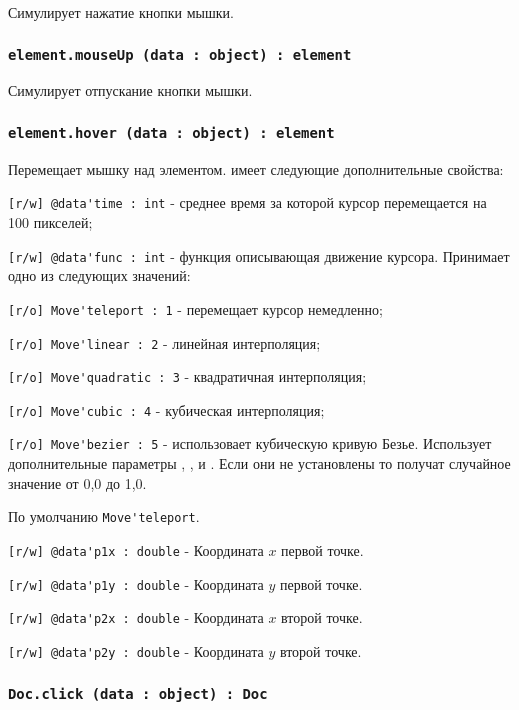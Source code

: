 Симулирует нажатие кнопки мышки.

\subsubsection{\lstinline|element.mouseUp (data : object) : element|}

Симулирует отпускание кнопки мышки.

\subsubsection{\lstinline|element.hover (data : object) : element|}

Перемещает мышку над элементом.  имеет следующие дополнительные свойства:
\begin{icItems}
	\item \lstinline|[r/w] @data'time : int| - среднее время за которой курсор перемещается на 100 пикселей;
	\item \lstinline|[r/w] @data'func : int| - функция описывающая движение курсора. Принимает одно из следующих значений:
	\begin{icItems}
		\item \lstinline|[r/o] Move'teleport : 1| - перемещает курсор немедленно;
		\item \lstinline|[r/o] Move'linear : 2| - линейная интерполяция;
		\item \lstinline|[r/o] Move'quadratic : 3| - квадратичная интерполяция;
		\item \lstinline|[r/o] Move'cubic : 4| - кубическая интерполяция;
		\item \lstinline|[r/o] Move'bezier : 5| - использовает кубическую кривую Безье. Использует дополнительные параметры , ,  и . Если они не установлены то получат случайное значение от 0,0 до 1,0.
	\end{icItems}
	По умолчанию \lstinline|Move'teleport|.
	\item \lstinline|[r/w] @data'p1x : double| - Координата $x$ первой точке.
	\item \lstinline|[r/w] @data'p1y : double| - Координата $y$ первой точке.
	\item \lstinline|[r/w] @data'p2x : double| - Координата $x$ второй точке.
	\item \lstinline|[r/w] @data'p2y : double| - Координата $y$ второй точке.
\end{icItems}

\subsubsection{\lstinline|Doc.click (data : object) : Doc|}

